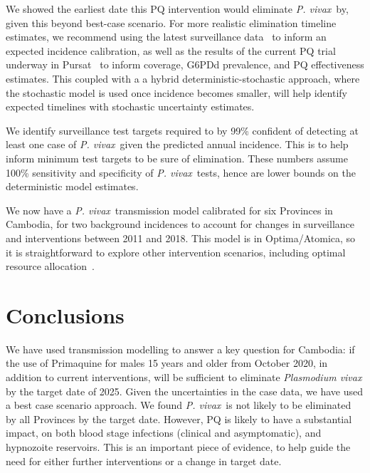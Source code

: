 \documentclass[doublespacing]{bmcart}
\newcommand{\pv}{\textit{P. vivax}}
\begin{document}
We showed the earliest date this PQ intervention would eliminate \pv~by, given this beyond best-case scenario. For more realistic elimination timeline estimates, we recommend using the latest surveillance data~\cite{pengby_mobile} to inform an expected incidence calibration, as well as the results of the current PQ trial underway in Pursat~\cite{CNM_trial} to inform coverage, G6PDd prevalence, and PQ effectiveness estimates. This coupled with a a hybrid deterministic-stochastic approach, where the stochastic model is used once incidence becomes smaller, will help identify expected timelines with stochastic uncertainty estimates. 


We identify surveillance test targets required to by 99\% confident of detecting at least one case of \pv~given the predicted annual incidence. This is to help inform minimum test targets to be sure of elimination. These numbers assume 100\% sensitivity and specificity of \pv~tests, hence are lower bounds on the deterministic model estimates.

We now have a \pv~transmission model calibrated for six Provinces in Cambodia, for two background incidences to account for changes in surveillance and interventions between 2011 and 2018. This model is in Optima/Atomica, so it is straightforward to explore other intervention scenarios, including optimal resource allocation~\cite{optima}.

\section*{Conclusions}

We have used transmission modelling to answer a key question for Cambodia: if the use of Primaquine for males 15 years and older from October 2020, in addition to current interventions, will be sufficient to eliminate \textit{Plasmodium vivax} by the target date of 2025. Given the uncertainties in the case data, we have used a best case scenario approach. We found \pv~is not likely to be eliminated by all Provinces by the target date. However, PQ is likely to have a substantial impact, on both blood stage infections (clinical and asymptomatic), and hypnozoite reservoirs. This is an important piece of evidence, to help guide the need for either further interventions or a change in target date. 
\end{document}

